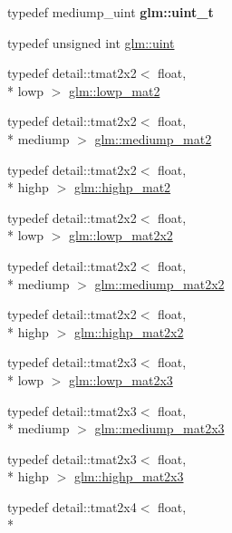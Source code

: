 \begin{DoxyCompactItemize}
\item 
\hypertarget{group__core__precision_ga5f2ae871c284c9d39ae8fdbb1305b566}{typedef mediump\-\_\-uint {\bfseries glm\-::uint\-\_\-t}}\label{group__core__precision_ga5f2ae871c284c9d39ae8fdbb1305b566}

\item 
typedef unsigned int \hyperlink{group__core__precision_ga4fd29415871152bfb5abd588334147c8}{glm\-::uint}
\item 
typedef detail\-::tmat2x2$<$ float, \\*
lowp $>$ \hyperlink{group__core__precision_gac0acc3ccf8da050af3393ea639f698d6}{glm\-::lowp\-\_\-mat2}
\item 
typedef detail\-::tmat2x2$<$ float, \\*
mediump $>$ \hyperlink{group__core__precision_ga6ed8bfa67b72cea216cb558411f95f86}{glm\-::mediump\-\_\-mat2}
\item 
typedef detail\-::tmat2x2$<$ float, \\*
highp $>$ \hyperlink{group__core__precision_gab9884251d84b95dbbf27aa1e4b3a1ec7}{glm\-::highp\-\_\-mat2}
\item 
typedef detail\-::tmat2x2$<$ float, \\*
lowp $>$ \hyperlink{group__core__precision_ga7d7e123d953978cc17de6882bb10400e}{glm\-::lowp\-\_\-mat2x2}
\item 
typedef detail\-::tmat2x2$<$ float, \\*
mediump $>$ \hyperlink{group__core__precision_ga867b486aea2d228a1e1a134af73b2c4b}{glm\-::mediump\-\_\-mat2x2}
\item 
typedef detail\-::tmat2x2$<$ float, \\*
highp $>$ \hyperlink{group__core__precision_ga694146b8d430b22caa8b37571d9bc8bc}{glm\-::highp\-\_\-mat2x2}
\item 
typedef detail\-::tmat2x3$<$ float, \\*
lowp $>$ \hyperlink{group__core__precision_gaef481e637af5103a83ab561d30d28f2a}{glm\-::lowp\-\_\-mat2x3}
\item 
typedef detail\-::tmat2x3$<$ float, \\*
mediump $>$ \hyperlink{group__core__precision_gad4e099c0dfa8f35ce9c0ddc8605428cf}{glm\-::mediump\-\_\-mat2x3}
\item 
typedef detail\-::tmat2x3$<$ float, \\*
highp $>$ \hyperlink{group__core__precision_ga7d4e5a1c803be5688c75241c924dfa58}{glm\-::highp\-\_\-mat2x3}
\item 
typedef detail\-::tmat2x4$<$ float, \\*

\end{DoxyCompactItemize}
